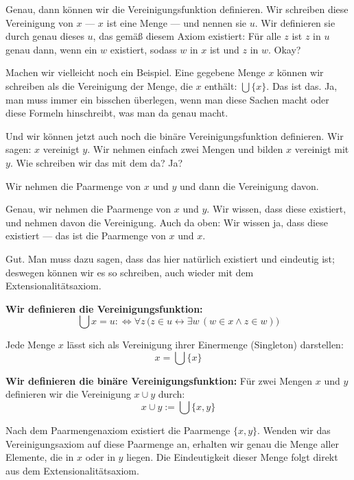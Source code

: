 \begin{spoken-clean}[00:15:06 - 00:17:17]
Genau, dann können wir die Vereinigungsfunktion definieren. Wir schreiben diese Vereinigung von $x$ --- $x$ ist eine Menge --- und nennen sie $u$. Wir definieren sie durch genau dieses $u$, das gemäß diesem Axiom existiert: Für alle $z$ ist $z$ in $u$ genau dann, wenn ein $w$ existiert, sodass $w$ in $x$ ist und $z$ in $w$. Okay?

Machen wir vielleicht noch ein Beispiel. Eine gegebene Menge $x$ können wir schreiben als die Vereinigung der Menge, die $x$ enthält: $\bigcup \{x\}$. Das ist das. Ja, man muss immer ein bisschen überlegen, wenn man diese Sachen macht oder diese Formeln hinschreibt, was man da genau macht.

Und wir können jetzt auch noch die binäre Vereinigungsfunktion definieren. Wir sagen: $x$ vereinigt $y$. Wir nehmen einfach zwei Mengen und bilden $x$ vereinigt mit $y$. Wie schreiben wir das mit dem da? Ja?
\end{spoken-clean}

\begin{student-interaction}[Studentenantwort]
Wir nehmen die Paarmenge von $x$ und $y$ und dann die Vereinigung davon.
\end{student-interaction}

\begin{spoken-clean}[continued]
Genau, wir nehmen die Paarmenge von $x$ und $y$. Wir wissen, dass diese existiert, und nehmen davon die Vereinigung. Auch da oben: Wir wissen ja, dass diese existiert --- das ist die Paarmenge von $x$ und $x$.

Gut. Man muss dazu sagen, dass das hier natürlich existiert und eindeutig ist; deswegen können wir es so schreiben, auch wieder mit dem Extensionalitätsaxiom.
\end{spoken-clean}

\begin{math-stroke}
\textbf{Wir definieren die Vereinigungsfunktion:}
\[
\bigcup x = u :\iff \forall z \, \bigl( z \in u \leftrightarrow \exists w \, (w \in x \land z \in w) \bigr)
\]

\begin{example}
Jede Menge $x$ lässt sich als Vereinigung ihrer Einermenge (Singleton) darstellen:
\[
x = \bigcup \{x\}
\]
\end{example}

\textbf{Wir definieren die binäre Vereinigungsfunktion:}
Für zwei Mengen $x$ und $y$ definieren wir die Vereinigung $x \cup y$ durch:
\[
x \cup y := \bigcup \{x, y\}
\]
\begin{explanation-of-steps}
Nach dem Paarmengenaxiom existiert die Paarmenge $\{x, y\}$. Wenden wir das Vereinigungsaxiom auf diese Paarmenge an, erhalten wir genau die Menge aller Elemente, die in $x$ oder in $y$ liegen. Die Eindeutigkeit dieser Menge folgt direkt aus dem Extensionalitätsaxiom.
\end{explanation-of-steps}
\end{math-stroke}

